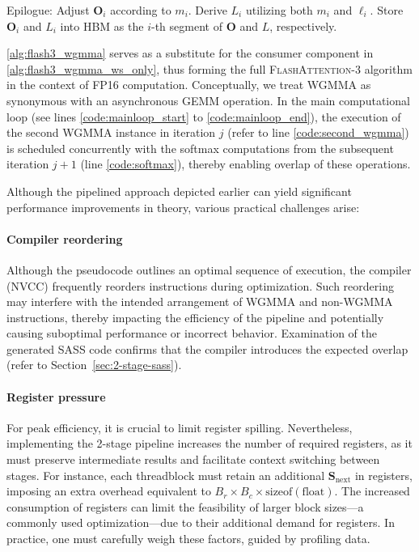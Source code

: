 \begin{enumerate}
\begin{algorithm}[H]
\begin{algorithmic}[1]
\STATE Epilogue: Adjust $\mathbf{O}_{i}$ according to $m_{i}$. Derive $L_{i}$ utilizing both $m_{i}$ and $\ell_{i}$. Store $\mathbf{O}_{i}$ and $L_{i}$ into HBM as the $i$-th segment of $\mathbf{O}$ and $L$, respectively.
\end{algorithmic}
\end{algorithm}

\cref{alg:flash3_wgmma} serves as a substitute for the consumer component in \cref{alg:flash3_wgmma_ws_only}, thus forming the full \textsc{FlashAttention-3} algorithm in the context of FP16 computation. Conceptually, we treat WGMMA as synonymous with an asynchronous GEMM operation. In the main computational loop (see lines \ref{code:mainloop_start} to \ref{code:mainloop_end}), the execution of the second WGMMA instance in iteration $j$ (refer to line \ref{code:second_wgmma}) is scheduled concurrently with the softmax computations from the subsequent iteration $j+1$ (line \ref{code:softmax}), thereby enabling overlap of these operations.

Although the pipelined approach depicted earlier can yield significant performance improvements in theory, various practical challenges arise:

\paragraph{Compiler reordering} Although the pseudocode outlines an optimal sequence of execution, the compiler (NVCC) frequently reorders instructions during optimization. Such reordering may interfere with the intended arrangement of WGMMA and non-WGMMA instructions, thereby impacting the efficiency of the pipeline and potentially causing suboptimal performance or incorrect behavior. Examination of the generated SASS code confirms that the compiler introduces the expected overlap (refer to Section~\ref{sec:2-stage-sass}).

\paragraph{Register pressure} For peak efficiency, it is crucial to limit register spilling. Nevertheless, implementing the 2-stage pipeline increases the number of required registers, as it must preserve intermediate results and facilitate context switching between stages. For instance, each threadblock must retain an additional $\mathbf{S}_{\mathrm{next}}$ in registers, imposing an extra overhead equivalent to $B_r \times B_c \times \text{sizeof}(\text{float})$. The increased consumption of registers can limit the feasibility of larger block sizes—a commonly used optimization—due to their additional demand for registers. In practice, one must carefully weigh these factors, guided by profiling data.


\end{enumerate}
